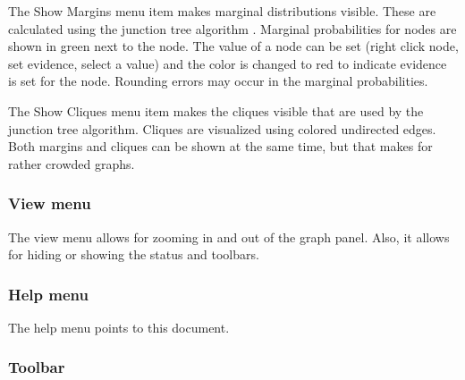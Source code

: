 \begin{center}
\end{center}

The Show Margins menu item makes marginal distributions visible.
These are calculated using the junction tree algorithm \cite{lauritzen}.
Marginal probabilities for nodes are shown in green next to the node.
The value of a node can be set (right click node, set evidence, select
a value) and the color is changed to red to indicate evidence is set
for the node. Rounding errors may occur in the marginal probabilities.

\begin{center}
\end{center}


The Show Cliques menu item makes the cliques visible that are used
by the junction tree algorithm. Cliques are visualized using colored
undirected edges. Both margins and cliques can be shown at the same time,
but that makes for rather crowded graphs.

\begin{center}
\end{center}


\subsubsection*{View menu}
The view menu allows for zooming in and out of the graph panel.
Also, it allows for hiding or showing the status and toolbars.

\begin{center}
\end{center}

\subsubsection*{Help menu}

The help menu points to this document.

\begin{center}
\end{center}


\subsubsection*{Toolbar}

